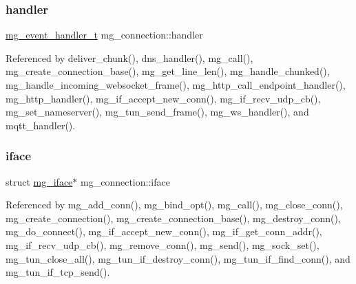 \subsubsection{\texorpdfstring{handler}{handler}}
{\footnotesize\ttfamily \hyperlink{mongoose_8h_ae5a76da37b3496fcdf561e51648eabda_ae5a76da37b3496fcdf561e51648eabda}{mg\+\_\+event\+\_\+handler\+\_\+t} mg\+\_\+connection\+::handler}



Referenced by deliver\+\_\+chunk(), dns\+\_\+handler(), mg\+\_\+call(), mg\+\_\+create\+\_\+connection\+\_\+base(), mg\+\_\+get\+\_\+line\+\_\+len(), mg\+\_\+handle\+\_\+chunked(), mg\+\_\+handle\+\_\+incoming\+\_\+websocket\+\_\+frame(), mg\+\_\+http\+\_\+call\+\_\+endpoint\+\_\+handler(), mg\+\_\+http\+\_\+handler(), mg\+\_\+if\+\_\+accept\+\_\+new\+\_\+conn(), mg\+\_\+if\+\_\+recv\+\_\+udp\+\_\+cb(), mg\+\_\+set\+\_\+nameserver(), mg\+\_\+tun\+\_\+send\+\_\+frame(), mg\+\_\+ws\+\_\+handler(), and mqtt\+\_\+handler().

\mbox{\label{structmg__connection_a6f337461553de516901473bd8bb11a0a_a6f337461553de516901473bd8bb11a0a}} 
\subsubsection{\texorpdfstring{iface}{iface}}
{\footnotesize\ttfamily struct \hyperlink{structmg__iface}{mg\+\_\+iface}$\ast$ mg\+\_\+connection\+::iface}



Referenced by mg\+\_\+add\+\_\+conn(), mg\+\_\+bind\+\_\+opt(), mg\+\_\+call(), mg\+\_\+close\+\_\+conn(), mg\+\_\+create\+\_\+connection(), mg\+\_\+create\+\_\+connection\+\_\+base(), mg\+\_\+destroy\+\_\+conn(), mg\+\_\+do\+\_\+connect(), mg\+\_\+if\+\_\+accept\+\_\+new\+\_\+conn(), mg\+\_\+if\+\_\+get\+\_\+conn\+\_\+addr(), mg\+\_\+if\+\_\+recv\+\_\+udp\+\_\+cb(), mg\+\_\+remove\+\_\+conn(), mg\+\_\+send(), mg\+\_\+sock\+\_\+set(), mg\+\_\+tun\+\_\+close\+\_\+all(), mg\+\_\+tun\+\_\+if\+\_\+destroy\+\_\+conn(), mg\+\_\+tun\+\_\+if\+\_\+find\+\_\+conn(), and mg\+\_\+tun\+\_\+if\+\_\+tcp\+\_\+send().

\mbox{\label{structmg__connection_aaf0f39b26deef84e6c204a176ea1e50a_aaf0f39b26deef84e6c204a176ea1e50a}} 
